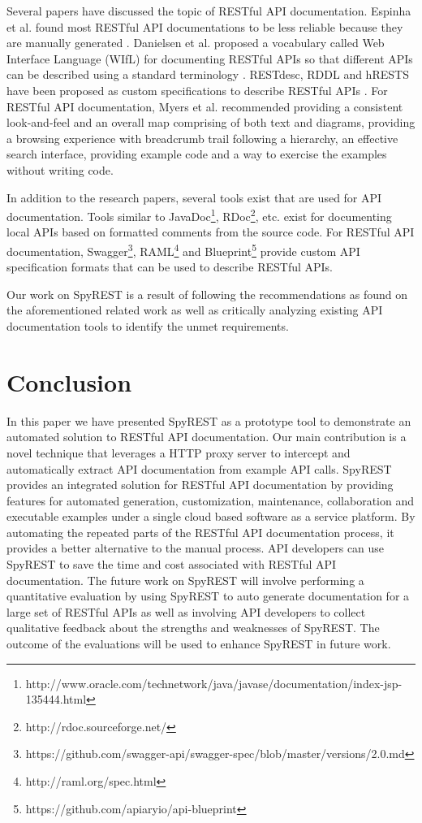 \documentclass[conference]{IEEEtran}
\begin{document}
Several papers have discussed the topic of RESTful API documentation. Espinha et al. found most RESTful API documentations to be less reliable because they are manually generated \cite{Espinha_web}. Danielsen et al. proposed a vocabulary called Web Interface Language (WIfL) for documenting RESTful APIs so that different APIs can be described using a standard terminology \cite{Danielsen_validation}. RESTdesc, RDDL and hRESTS have been proposed as custom specifications to describe RESTful APIs \cite{Verborgh_functional, Mangler_rddl, Kopecky_hrests}. For RESTful API documentation, Myers et al. recommended providing a consistent look-and-feel and an overall map comprising of both text and diagrams, providing a browsing experience with breadcrumb trail following a hierarchy, an effective search interface, providing example code and a way to exercise the examples without writing code.

In addition to the research papers, several tools exist that are used for API documentation. Tools similar to JavaDoc\footnote{http://www.oracle.com/technetwork/java/javase/documentation/index-jsp-135444.html}, RDoc\footnote{http://rdoc.sourceforge.net/}, etc. exist for documenting local APIs based on formatted comments from the source code. For RESTful API documentation, Swagger\footnote{https://github.com/swagger-api/swagger-spec/blob/master/versions/2.0.md}, RAML\footnote{http://raml.org/spec.html} and Blueprint\footnote{https://github.com/apiaryio/api-blueprint} provide custom API specification formats that can be used to describe RESTful APIs.

Our work on SpyREST is a result of following the recommendations as found on the aforementioned related work as well as critically analyzing existing API documentation tools to identify the unmet requirements.

\section{Conclusion}
In this paper we have presented SpyREST as a prototype tool to demonstrate an automated solution to RESTful API documentation. Our main contribution is a novel technique that leverages a HTTP proxy server to intercept and automatically extract API documentation from example API calls. SpyREST provides an integrated solution for RESTful API documentation by providing features for automated generation, customization, maintenance, collaboration and executable examples under a single cloud based software as a service platform. By automating the repeated parts of the RESTful API documentation process, it provides a better alternative to the manual process. API developers can use SpyREST to save the time and cost associated with RESTful API documentation. The future work on SpyREST will involve performing a quantitative evaluation by using SpyREST to auto generate documentation for a large set of RESTful APIs as well as involving API developers to collect qualitative feedback about the strengths and weaknesses of SpyREST. The outcome of the evaluations will be used to enhance SpyREST in future work.



\end{document}
